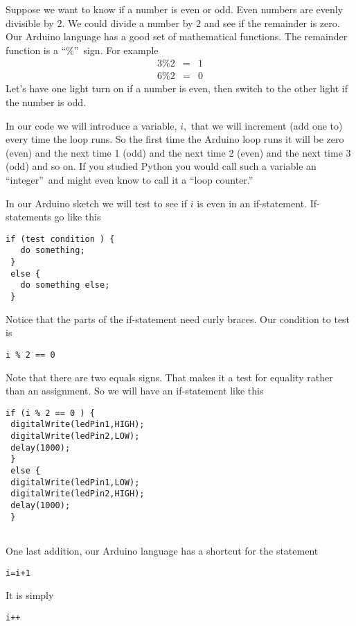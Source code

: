 Suppose we want to know if a number is even or odd. Even numbers are evenly
divisible by $2.$ We could divide a number by $2$ and see if the remainder
is zero. Our Arduino language has a good set of mathematical functions. The
remainder function is a \textquotedblleft \%\textquotedblright\ sign. For
example 
\begin{eqnarray*}
3\%2 &=&1 \\
6\%2 &=&0
\end{eqnarray*}%
Let's have one light turn on if a number is even, then switch to the other
light if the number is odd.

In our code we will introduce a variable, $i,$ that we will increment (add
one to) every time the loop runs. So the first time the Arduino loop runs it
will be zero (even) and the next time 1 (odd) and the next time 2 (even) and
the next time 3 (odd) and so on. If you studied Python you would call such a
variable an \textquotedblleft integer\textquotedblright\ and might even know
to call it a \textquotedblleft loop counter.\textquotedblright

In our Arduino sketch we will test to see if $i$ is even in an if-statement.
If-statements go like this
 \begin{lstlisting}[language=Arduino]
 if (test condition ) {
   do something;
 }
 else {
   do something else;
 }
 \end{lstlisting}

Notice that the parts of the if-statement need curly braces. Our condition
to test is
 \begin{lstlisting}[language=Arduino]
i % 2 == 0
 \end{lstlisting}

Note that there are two equals signs. That makes it a test for equality
rather than an assignment. So we will have an if-statement like this
 \begin{lstlisting}[language=Arduino]
if (i % 2 == 0 ) {
 digitalWrite(ledPin1,HIGH);
 digitalWrite(ledPin2,LOW);
 delay(1000);
 }
 else {
 digitalWrite(ledPin1,LOW);
 digitalWrite(ledPin2,HIGH);
 delay(1000);
 }
 
 \end{lstlisting}

One last addition, our Arduino language has a shortcut for the statement
 \begin{lstlisting}[language=Arduino]
i=i+1
 \end{lstlisting}

It is simply
 \begin{lstlisting}[language=Arduino]
i++
 \end{lstlisting}

